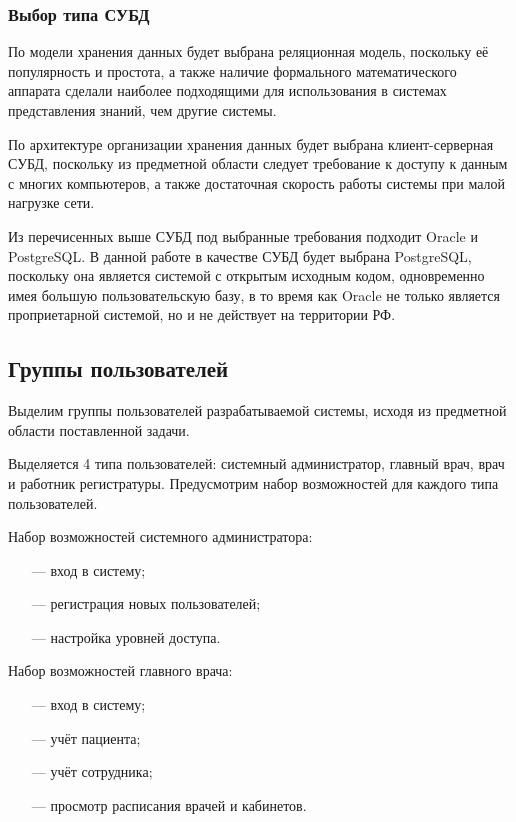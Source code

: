 \subsubsection{Выбор типа СУБД}

По модели хранения данных будет выбрана реляционная модель, поскольку её популярность и простота, а также наличие формального математического аппарата сделали наиболее подходящими для использования в системах представления знаний, чем другие системы.

По архитектуре организации хранения данных будет выбрана \newline клиент-серверная СУБД, поскольку из предметной области следует требование к доступу к данным с многих компьютеров, а также достаточная скорость работы системы при малой нагрузке сети.

Из перечисенных выше СУБД под выбранные требования подходит Oracle и PostgreSQL. 
В данной работе в качестве СУБД будет выбрана PostgreSQL, поскольку она является системой с открытым исходным кодом, одновременно имея большую пользовательскую базу, в то время как Oracle не только является проприетарной системой, но и не действует на территории РФ. 

\subsection{Группы пользователей}

Выделим группы пользователей разрабатываемой системы, исходя из \linebreak предметной области поставленной задачи.

Выделяется 4 типа пользователей: системный администратор, главный врач, врач и работник регистратуры.
Предусмотрим набор возможностей для каждого типа пользователей.

Набор возможностей системного администратора:
\begin{itemize}[leftmargin=1.6\parindent]
	\item[---] вход в систему;
	\item[---] регистрация новых пользователей;
	\item[---] настройка уровней доступа.
\end{itemize}

Набор возможностей главного врача:
\begin{itemize}[leftmargin=1.6\parindent]
	\item[---] вход в систему;
	\item[---] учёт пациента;
	\item[---] учёт сотрудника;
	\item[---] просмотр расписания врачей и кабинетов.
\end{itemize}


